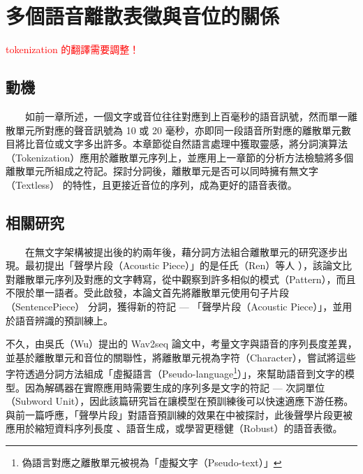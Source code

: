\chapter{多個語音離散表徵與音位的關係}

\textcolor{red}{tokenization 的翻譯需要調整！}

\section{動機}

　　如前一章所述，一個文字或音位往往對應到上百毫秒的語音訊號，然而單一離散單元所對應的聲音訊號為 10 或 20 毫秒，亦即同一段語音所對應的離散單元數目將比音位或文字多出許多。本章節從自然語言處理中獲取靈感，將分詞演算法（Tokenization）應用於離散單元序列上，並應用上一章節的分析方法檢驗將多個離散單元所組成之符記。探討分詞後，離散單元是否可以同時擁有無文字（Textless）\cite{lakhotia_generative_2021, lakhotia_generative_2021-1, noauthor_textless_2021} 的特性，且更接近音位的序列，成為更好的語音表徵。

\section{相關研究} 

　　在無文字架構被提出後的約兩年後，藉分詞方法組合離散單元的研究逐步出現。最初提出「聲學片段（Acoustic Piece）」的是任氏（Ren）等人 \cite{ren_speech_2022}），該論文比對離散單元序列及對應的文字轉寫，從中觀察到許多相似的模式（Pattern），而且不限於單一語者。受此啟發，本論文首先將離散單元使用句子片段（SentencePiece） \cite{kudo_sentencepiece_2018} 分詞，獲得新的符記 --- 「聲學片段（Acoustic Piece）」，並用於語音辨識的預訓練上。

        不久，由吳氏（Wu）提出的 Wav2seq \cite{wu_wav2seq_2023}論文中，考量文字與語音的序列長度差異，並基於離散單元和音位的關聯性，將離散單元視為字符（Character），嘗試將這些字符透過分詞方法組成「虛擬語言（Pseudo-language\footnote{偽語言對應之離散單元被視為「虛擬文字（Pseudo-text）」}）」，來幫助語音到文字的模型。因為解碼器在實際應用時需要生成的序列多是文字的符記 --- 次詞單位（Subword Unit），因此該篇研究旨在讓模型在預訓練後可以快速適應下游任務。與前一篇呼應，「聲學片段」對語音預訓練的效果在\cite{10096788}中被探討，此後聲學片段更被應用於縮短資料序列長度\cite{chang_exploration_2023} 、語音生成\cite{shen2024acoustic}，或學習更穩健（Robust）的語音表徵\cite{chang2023r}。

